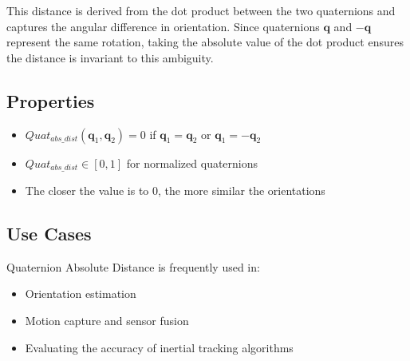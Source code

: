 \documentclass{iutbscthesis}
\begin{document}
\begin{appendices}
This distance is derived from the dot product between the two quaternions and captures the angular difference in orientation. Since quaternions $\mathbf{q}$ and $-\mathbf{q}$ represent the same rotation, taking the absolute value of the dot product ensures the distance is invariant to this ambiguity.

\subsection{Properties}
\begin{itemize}
    \item $Quat_{abs\_dist}(\mathbf{q}_1, \mathbf{q}_2) = 0$ if $\mathbf{q}_1 = \mathbf{q}_2$ or $\mathbf{q}_1 = -\mathbf{q}_2$
    \item $Quat_{abs\_dist} \in [0, 1]$ for normalized quaternions
    \item The closer the value is to $0$, the more similar the orientations
\end{itemize}

\subsection{Use Cases}
Quaternion Absolute Distance is frequently used in:
\begin{itemize}
    \item Orientation estimation
    \item Motion capture and sensor fusion
    \item Evaluating the accuracy of inertial tracking algorithms
\end{itemize}
\end{appendices}
\end{document}
